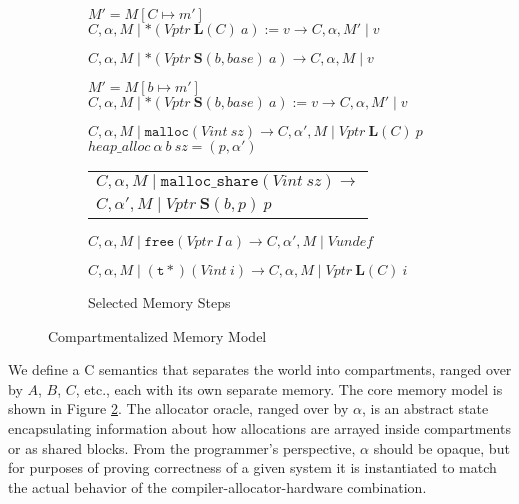 \documentclass{article}
\begin{document}
\begin{figure}
\begin{subfigure}{0.59\textwidth}
                {\(M' = M[C \mapsto m']\)}
                {\(C, \alpha, M \mid *(\mathit{Vptr} ~ \mathbf{L}(C) ~ a) := v
                  \longrightarrow C, \alpha, M' \mid v\)}

             {\(C, \alpha, M \mid *(\mathit{Vptr} ~ \mathbf{S}(b, \mathit{base}) ~ a)
               \longrightarrow C, \alpha, M \mid v\)}

                {\(M' = M[b \mapsto m']\)}
                {\(C, \alpha, M \mid *(\mathit{Vptr} ~ \mathbf{S}(b, \mathit{base}) ~ a) := v
                  \longrightarrow C, \alpha, M' \mid v\)}

             {\(C, \alpha, M \mid \mathtt{malloc}(\mathit{Vint} ~ sz) \longrightarrow
               C, \alpha', M \mid \mathit{Vptr} ~ \mathbf{L}(C) ~ p\)}
                {\(\mathit{heap\_alloc} ~ \alpha ~ b ~ sz = (p, \alpha')\)}
                {\begin{tabular}{l}
                    \(C, \alpha, M \mid \mathtt{malloc\_share}(\mathit{Vint} ~ sz) \longrightarrow\) \\
                    \(C, \alpha', M \mid \mathit{Vptr} ~ \mathbf{S}(b,p) ~ p\)
                \end{tabular}}

             {\(C, \alpha, M \mid \mathtt{free}(\mathit{Vptr} ~ I ~ a) \longrightarrow
               C, \alpha', M \mid \mathit{Vundef}\)}
                
    \judgment{}
             {\(C,\alpha,M \mid \mathtt{(t*)} (\mathit{Vint} ~ i) \longrightarrow
               C,\alpha,M \mid \mathit{Vptr} ~ \mathbf{L}(C) ~ \mathit{i}\)}

    \caption{Selected Memory Steps}
    \label{subfig:steps}
  \end{subfigure}

  \caption{Compartmentalized Memory Model}
  \label{fig:memmod}
\end{figure}

We define a C semantics that separates the world into compartments, ranged over by
\(A\), \(B\), \(C\), etc., each with its own separate memory. The core memory model
is shown in Figure \ref{fig:memmod}. The allocator oracle, ranged over by \(\alpha\),
is an abstract state encapsulating information about how allocations
are arrayed inside compartments or as shared blocks. From the programmer's
perspective, \(\alpha\) should be opaque, but for purposes of proving correctness
of a given system it is instantiated to match the actual behavior of the
compiler-allocator-hardware combination. 
\end{document}
